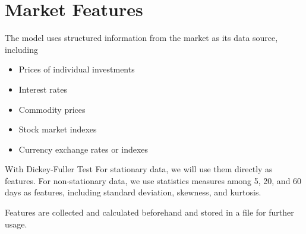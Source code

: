 \section{Market Features}
The model uses structured information from the market as its data source, including
\begin{itemize}
\itemsep -1em  
\item Prices of individual investments
\item Interest rates
\item Commodity prices
\item Stock market indexes
\item Currency exchange rates or indexes
\end{itemize}
\par
With Dickey-Fuller Test
For stationary data, we will use them directly as features. For non-stationary data, we use statistics measures among 5, 20, and 60 days as features, including standard deviation, skewness, and kurtosis.
\par
Features are collected and calculated beforehand and stored in a file for further usage.